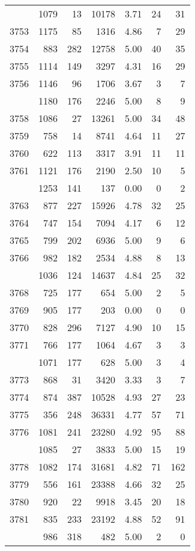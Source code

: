 \documentclass[
]{article}
\begin{document}
\begin{table}
\begin{tabular}[t]{lrrrrrr}
\addlinespace
3752 & 1079 & 13 & 10178 & 3.71 & 24 & 31\\
3753 & 1175 & 85 & 1316 & 4.86 & 7 & 29\\
3754 & 883 & 282 & 12758 & 5.00 & 40 & 35\\
3755 & 1114 & 149 & 3297 & 4.31 & 16 & 29\\
3756 & 1146 & 96 & 1706 & 3.67 & 3 & 7\\
\addlinespace
3757 & 1180 & 176 & 2246 & 5.00 & 8 & 9\\
3758 & 1086 & 27 & 13261 & 5.00 & 34 & 48\\
3759 & 758 & 14 & 8741 & 4.64 & 11 & 27\\
3760 & 622 & 113 & 3317 & 3.91 & 11 & 11\\
3761 & 1121 & 176 & 2190 & 2.50 & 10 & 5\\
\addlinespace
3762 & 1253 & 141 & 137 & 0.00 & 0 & 2\\
3763 & 877 & 227 & 15926 & 4.78 & 32 & 25\\
3764 & 747 & 154 & 7094 & 4.17 & 6 & 12\\
3765 & 799 & 202 & 6936 & 5.00 & 9 & 6\\
3766 & 982 & 182 & 2534 & 4.88 & 8 & 13\\
\addlinespace
3767 & 1036 & 124 & 14637 & 4.84 & 25 & 32\\
3768 & 725 & 177 & 654 & 5.00 & 2 & 5\\
3769 & 905 & 177 & 203 & 0.00 & 0 & 0\\
3770 & 828 & 296 & 7127 & 4.90 & 10 & 15\\
3771 & 766 & 177 & 1064 & 4.67 & 3 & 3\\
\addlinespace
3772 & 1071 & 177 & 628 & 5.00 & 3 & 4\\
3773 & 868 & 31 & 3420 & 3.33 & 3 & 7\\
3774 & 874 & 387 & 10528 & 4.93 & 27 & 23\\
3775 & 356 & 248 & 36331 & 4.77 & 57 & 71\\
3776 & 1081 & 241 & 23280 & 4.92 & 95 & 88\\
\addlinespace
3777 & 1085 & 27 & 3833 & 5.00 & 15 & 19\\
3778 & 1082 & 174 & 31681 & 4.82 & 71 & 162\\
3779 & 556 & 161 & 23388 & 4.66 & 32 & 25\\
3780 & 920 & 22 & 9918 & 3.45 & 20 & 18\\
3781 & 835 & 233 & 23192 & 4.88 & 52 & 91\\
\addlinespace
3782 & 986 & 318 & 482 & 5.00 & 2 & 0\\

\end{tabular}
\end{table}
\end{document}
